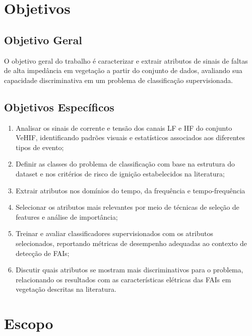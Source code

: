 \section{Objetivos}

\subsection{Objetivo Geral}

O objetivo geral do trabalho é caracterizar e extrair atributos de sinais de faltas de alta impedância em vegetação a partir do conjunto de dados, avaliando sua capacidade discriminativa em um problema de classificação supervisionada.

\subsection{Objetivos Específicos}

\begin{enumerate}
\item Analisar os sinais de corrente e tensão dos canais LF e HF do conjunto VeHIF, identificando padrões visuais e estatísticos associados aos diferentes tipos de evento;

\item Definir as classes do problema de classificação com base na estrutura do dataset e nos critérios de risco de ignição estabelecidos na literatura;

\item Extrair atributos nos domínios do tempo, da frequência e tempo-frequência

\item Selecionar os atributos mais relevantes por meio de técnicas de seleção de features e análise de importância;

\item Treinar e avaliar classificadores supervisionados com os atributos selecionados, reportando métricas de desempenho adequadas ao contexto de detecção de FAIs;

\item Discutir quais atributos se mostram mais discriminativos para o problema, relacionando os resultados com as características elétricas das FAIs em vegetação descritas na literatura.

\end{enumerate}


\section{Escopo}

